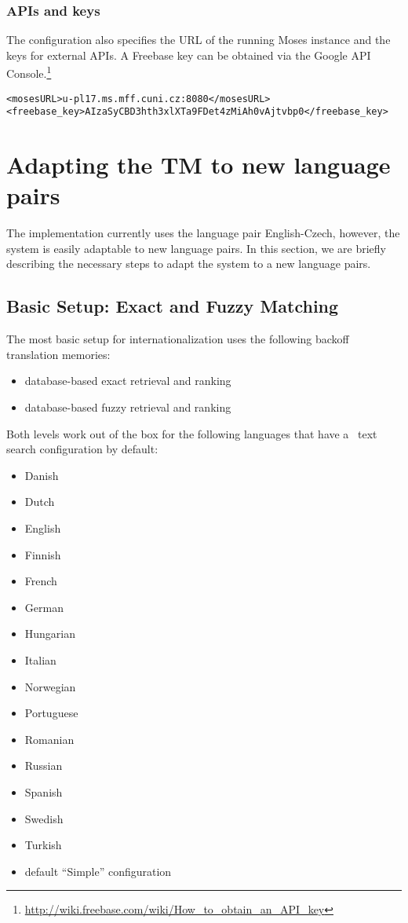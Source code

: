 \subsubsection{APIs and keys}

The configuration also specifies the URL of the running Moses instance and the keys for external APIs. A Freebase key can be obtained via the Google API Console.\footnote{\url{http://wiki.freebase.com/wiki/How_to_obtain_an_API_key}}

\begin{lstlisting}
<mosesURL>u-pl17.ms.mff.cuni.cz:8080</mosesURL>
<freebase_key>AIzaSyCBD3hth3xlXTa9FDet4zMiAh0vAjtvbp0</freebase_key>
\end{lstlisting}


\section{Adapting the TM to new language pairs}
\label{sec:internationalization}

The implementation currently uses the language pair English-Czech, however, the system is easily adaptable to new language pairs. In this section, we are briefly describing the necessary steps to adapt the system to a new language pairs.

\subsection{Basic Setup: Exact and Fuzzy Matching}

The most basic setup for internationalization uses the following backoff translation memories:

\begin{itemize}
	\item database-based exact retrieval and ranking
	\item database-based fuzzy retrieval and ranking
\end{itemize}

Both levels work out of the box for the following languages that have a \postgres~text search configuration by default:

\begin{itemize}
	\item Danish
	\item Dutch
	\item English
	\item Finnish
	\item French
	\item German
	\item Hungarian
	\item Italian
	\item Norwegian
	\item Portuguese
	\item Romanian
	\item Russian
	\item Spanish
	\item Swedish
	\item Turkish
	\item default “Simple” configuration
\end{itemize}

